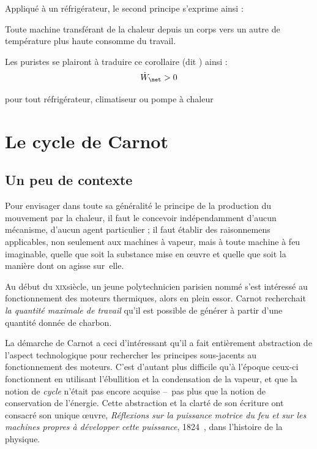 \begin{description}
{			Appliqué à un réfrigérateur, le second principe s’exprime ainsi :

			\begin{trucimportant}
			Toute machine transférant de la chaleur depuis un corps vers un autre de température plus haute consomme du travail.
			\end{trucimportant}

			Les puristes se plairont à traduire ce corollaire (dit ) ainsi :
			\begin{equation}
				\dot W_\net > 0
			\end{equation}
			\begin{equationterms}
				\item pour tout réfrigérateur, climatiseur ou pompe à chaleur
			\end{equationterms}

		}%
		\end{description}


\section{Le cycle de Carnot}
\label{ch_cycle_de_carnot}

	\subsection{Un peu de contexte}
	\label{ch_contexte_cycle_carnot}

			Pour envisager dans toute sa généralité le principe de la production du mouvement par la chaleur, il faut le concevoir indépendamment d’aucun mécanisme, d’aucun agent particulier ; il faut établir des raisonnemens applicables, non seulement aux machines à vapeur, mais à toute machine à feu imaginable, quelle que soit la substance mise en œuvre et quelle que soit la manière dont on agisse sur~elle.

		Au début du \textsc{xix}\ieme siècle, un jeune polytechnicien parisien nommé  s’est intéressé au fonctionnement des moteurs thermiques, alors en plein essor. Carnot recherchait \emph{la quantité maximale de travail} qu’il est possible de générer à partir d’une quantité donnée de charbon.

		La démarche de Carnot a ceci d’intéressant qu’il a fait entièrement abstraction de l’aspect technologique pour rechercher les principes sous-jacents au fonctionnement des moteurs. C’est d’autant plus difficile qu’à l’époque ceux-ci fonctionnent en utilisant l’ébullition et la condensation de la vapeur, et que la notion de \emph{cycle} n’était pas encore acquise --\ pas plus que la notion de conservation de l’énergie. Cette abstraction et la clarté de son écriture ont consacré son unique œuvre, \textit{Réflexions sur la puissance motrice du feu et sur les machines propres à développer cette puissance}, 1824~\cite{carnot1824}, dans l’histoire de la physique.

